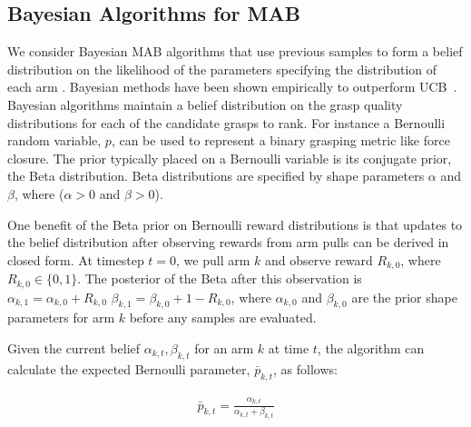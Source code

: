 \documentclass[10pt, conference]{ieeeconf}      %
\begin{document}
\subsection{Bayesian Algorithms for MAB}\label{sec:bandit_algorithm}
We consider Bayesian MAB algorithms that use previous samples to form a belief distribution on the likelihood of the parameters specifying the distribution of each arm \cite{weber1992gittins,agrawal2011analysis}.  Bayesian methods have been shown empirically to outperform UCB~\cite{chapelle2011empirical, bachman2013greedy}. Bayesian algorithms maintain a belief distribution on the grasp quality distributions for each of the candidate grasps to rank. For instance a Bernoulli random variable, $p$, can be used to represent a binary grasping metric like force closure. The prior typically placed on a Bernoulli variable is its conjugate prior, the Beta distribution.
Beta distributions are specified by shape parameters $\alpha$ and $\beta$, where ($\alpha >0$ and $\beta >0$).


One benefit of the Beta prior on Bernoulli reward distributions is that updates to the belief distribution after observing rewards from arm pulls can be derived in closed form.
At timestep $t=0$, we pull arm $k$ and observe reward $R_{k,0}$, where $R_{k,0} \in \lbrace 0, 1\rbrace$.
The posterior of the Beta after this observation is $\alpha_{k, 1} = \alpha_{k, 0} + R_{k,0}$  $\beta_{k, 1} = \beta_{k, 0} + 1-R_{k,0}$, where $\alpha_{k,0}$ and $\beta_{k,0}$ are the prior shape parameters for arm $k$ before any samples are evaluated.

Given the current belief $\alpha_{k, t}, \beta_{k, t}$ for an arm $k$ at time $t$, the algorithm can calculate the expected Bernoulli parameter, $\bar{p}_{k,t}$, as follows:

\vspace{-2ex}
\begin{align}\label{eq:shape_sampling}
\bar{p}_{k,t} = \frac{\alpha_{k,t}}{\alpha_{k,t} + \beta_{k,t}}
\end{align}




\end{document}
